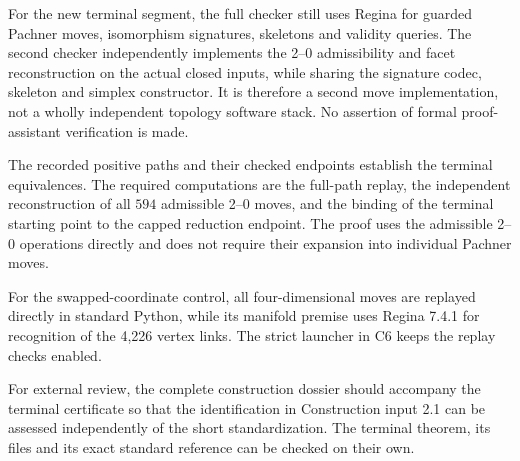 \documentclass[11pt,letterpaper]{article}
\begin{document}
For the new terminal segment, the full checker still uses Regina for guarded Pachner moves, isomorphism signatures, skeletons and validity queries. The second checker independently implements the 2--0 admissibility and facet reconstruction on the actual closed inputs, while sharing the signature codec, skeleton and simplex constructor. It is therefore a second move implementation, not a wholly independent topology software stack. No assertion of formal proof-assistant verification is made.

The recorded positive paths and their checked endpoints establish the terminal equivalences. The required computations are the full-path replay, the independent reconstruction of all $594$ admissible 2--0 moves, and the binding of the terminal starting point to the capped reduction endpoint. The proof uses the admissible 2--0 operations directly and does not require their expansion into individual Pachner moves.

For the swapped-coordinate control, all four-dimensional moves are replayed directly in standard Python, while its manifold premise uses Regina 7.4.1 for recognition of the 4,226 vertex links. The strict launcher in C6 keeps the replay checks enabled.

For external review, the complete construction dossier should accompany the terminal certificate so that the identification in Construction input 2.1 can be assessed independently of the short standardization. The terminal theorem, its files and its exact standard reference can be checked on their own.
\end{document}
